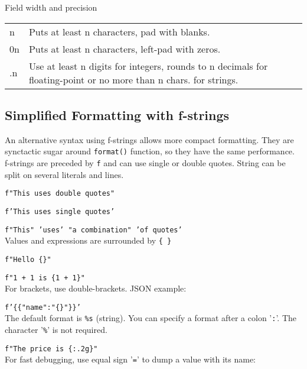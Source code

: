 \hangpar \textsf{Field width} and \textsf{precision}\\
\begin{tabular}{@{}lp{}}
\textsf{n} & Puts at least \textsf{n} characters, pad with blanks. \\
\textsf{0n} & Puts at least \textsf{n} characters, left-pad with zeros. \\
\textsf{.n} & Use at least \textsf{n} digits for integers, rounds to \textsf{n} decimals for floating-point or no more than \textsf{n} chars. for strings. \\
\end{tabular}

\subsection*{Simplified Formatting with f-strings}

\hangpar An alternative syntax using f-strings allows more compact formatting.
They are synctactic sugar around \texttt{format()} function, so they have the same performance.\\

\hangpar f-strings are preceded by \texttt{f} and can use single or double quotes. String can be split on several literals and lines.

\texttt{f"This uses double quotes"}

\texttt{f'This uses single quotes'}

\texttt{f"This" 'uses' "a combination" 'of quotes'}\\

\hangpar Values and expressions are  surrounded by \texttt{\{ \}}

\texttt{f"Hello \{}\texttt{\}"}

\texttt{f"1 + 1 is \{1 + 1\}"}\\

\hangpar For brackets, use double-brackets. JSON example:

\texttt{f'\{\{"name":"\{}\texttt{\}"\}\}'}\\

\hangpar The default format is \texttt{\%s} (string). You can specify a format after a colon '\texttt{:}'. The character '\texttt{\%}' is not required.

\texttt{f"The price is \{}\texttt{:.2g\}"}\\

\hangpar For fast debugging, use equal sign '\texttt{=}' to dump a value with its name:

